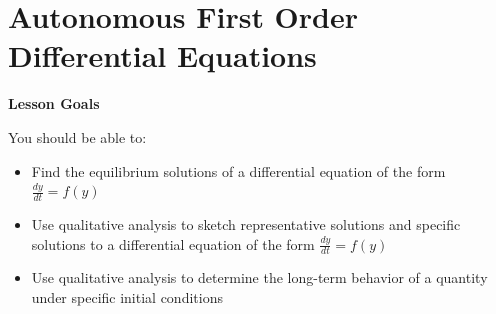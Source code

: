 \documentclass[main]{subfiles}
\begin{document}
\ifSubfilesClassLoaded{%
  \chaptermark{\chapterthree}
}{}

\section{Autonomous First Order Differential Equations} \label{ws3-3}

\begin{framed}
\centerline{\textbf{Lesson Goals}}

You should be able to:
\begin{itemize}
\item Find the equilibrium solutions of a differential equation of the form $\frac{dy}{dt}=f(y)$
\item Use qualitative analysis to sketch representative solutions and specific solutions to a differential equation of the form $\frac{dy}{dt}=f(y)$
\item Use qualitative analysis to determine the long-term behavior of a quantity under specific initial conditions
\end{itemize}
\end{framed}
\end{document}
